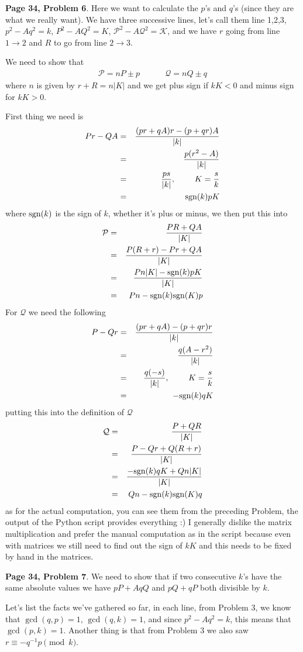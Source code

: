 \documentclass[aps,preprint,preprintnumbers,nofootinbib,showpacs,prd]{revtex4-1}
\newcommand{\nbea}{\begin{eqnarray*}}
\newcommand{\neea}{\end{eqnarray*}}
\begin{document}
{\bf Page 34, Problem 6}. Here we want to calculate the $p$'s and $q$'s (since they are what we really want). We have three successive lines, let's call them line 1,2,3, $p^2 - Aq^2 = k$, $P^2 - AQ^2 = K$, $\mathcal{P}^2 - A\mathcal{Q}^2 = \mathcal{K}$, and we have $r$ going from line $1\to2$ and $R$ to go from line $2\to3$.

We need to show that 
%
\nbea
\mathcal{P} = nP \pm p ~~~~~~~~~~~~~~ \mathcal{Q} = nQ \pm q
\neea
%
where $n$ is given by $r + R = n|K|$ and we get plus sign if $kK < 0$ and minus sign for $kK > 0$.

First thing we need is
%
\nbea
Pr - QA & = & \frac{(pr + qA)r - (p + qr)A}{|k|} \\
& = & \frac{p(r^2 - A)}{|k|} \\
& = & \frac{ps}{|k|}, ~~~~~~~ K = \frac{s}{k} \\
& = & {\rm sgn}(k) pK
\neea
%
where ${\rm sgn}(k)$ is the sign of $k$, whether it's plus or minus, we then put this into
%
\nbea
\mathcal{P} & = & \frac{PR + QA}{|K|} \\
& = & \frac{P(R + r) - Pr + QA}{|K|} \\
& = & \frac{Pn|K| - {\rm sgn}(k) pK}{|K|} \\
& = & Pn - {\rm sgn}(k) {\rm sgn}(K) p
\neea
%
For $\mathcal{Q}$ we need the following
%
\nbea
P -Qr & = & \frac{(pr + qA) - (p + qr)r}{|k|} \\
& = & \frac{q(A-r^2)}{|k|} \\
& = & \frac{q(-s)}{|k|}, ~~~~~~~ K = \frac{s}{k} \\
& = & -{\rm sgn}(k)q K
\neea
%
putting this into the definition of $\mathcal{Q}$
%
\nbea
\mathcal{Q} & = & \frac{P + QR}{|K|} \\
& = & \frac{P - Qr + Q(R + r)}{|K|} \\
& = & \frac{-{\rm sgn}(k) qK + Qn|K|}{|K|} \\
& = & Qn - {\rm sgn}(k){\rm sgn}(K) q
\neea
%
as for the actual computation, you can see them from the preceding Problem, the output of the Python script provides everything :) I generally dislike the matrix multiplication and prefer the manual computation as in the script because even with matrices we still need to find out the sign of $kK$ and this needs to be fixed by hand in the matrices.

{\bf Page 34, Problem 7}. We need to show that if two consecutive $k$'s have the same absolute values we have $pP + AqQ$ and $pQ + qP$ both divisible by $k$.

Let's list the facts we've gathered so far, in each line, from Problem 3, we know that $\gcd(q,p) = 1$, $\gcd(q,k) = 1$, and since $p^2 - Aq^2 = k$, this means that $\gcd(p,k) = 1$. Another thing is that from Problem 3 we also saw $r \equiv -q^{-1}p \pmod{k}$.
\end{document}

